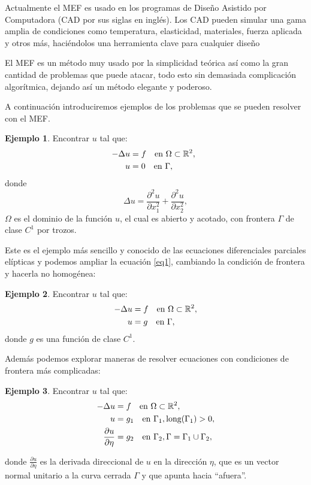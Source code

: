 \documentclass[12pt,spanish,oneside]{book}
\theoremstyle{plain}
\numberwithin{equation}{chapter}
\theoremstyle{definition}
\newtheorem{ej}{Ejemplo}[chapter]
\theoremstyle{remark}
\newcommand{\re}{\mathbb{R}}
\newcommand{\parc}[2]{\frac{\partial #1}{\partial #2}}
\begin{document}
Actualmente el MEF es usado en los programas de Diseño Asistido por Computadora (CAD por sus siglas en inglés). Los CAD pueden simular una gama amplia de condiciones como temperatura, elasticidad, materiales, fuerza aplicada y otros más, haciéndolos una herramienta clave para cualquier diseño

El MEF es un método muy usado por la simplicidad teórica así como la gran cantidad de problemas que puede atacar, todo esto sin demasiada complicación algorítmica, dejando así un método elegante y poderoso. 

A continuación introduciremos ejemplos de los problemas que se pueden resolver con el MEF. 

\begin{ej}
Encontrar $u$ tal que: 
\begin{equation}\label{eq1}
\begin{aligned}
-\Delta u &= f \hspace{10 pt} \text{en } \Omega \subset \re^2, \hspace{5pt} \\
u &=0 \hspace{10 pt} \text{en } \Gamma,
\end{aligned}
\end{equation}
donde \[\Delta u = \frac{\partial^2 u}{\partial x_1^2}+\frac{\partial^2 u}{\partial x_2^2},\] $\Omega $ es el dominio de la función $u$, el cual es abierto y acotado, con frontera $\Gamma$ de clase $C^1$ por trozos. 
\end{ej}
Este es el ejemplo más sencillo y conocido de las ecuaciones diferenciales parciales elípticas y podemos ampliar la ecuación \ref{eq1}, cambiando la condición de frontera y hacerla no homogénea:
\begin{ej}
Encontrar $u$ tal que: 
\begin{align*}
-\Delta u &= f \hspace{10 pt} \text{en } \Omega \subset \re^2, \\
u &=g\hspace{10 pt} \text{en } \Gamma, 
\end{align*}
donde $g$ es una función de clase $ C^1$.
\end{ej} 

Además podemos explorar maneras de resolver ecuaciones con condiciones de frontera más complicadas: 

\begin{ej}\label{otrcond}
Encontrar $u$ tal que: 
\begin{align*}
-\Delta u &= f \hspace{10 pt} \text{en } \Omega \subset \re^2 , \\
u &=g_1 \hspace{10 pt} \text{en } \Gamma_1 , \text{long}(\Gamma_1)>0,\\
\parc{u}{\eta} &=g_2 \hspace{10 pt} \text{en } \Gamma_2 , \Gamma= \Gamma_1\cup \Gamma_2,
\end{align*}

donde $\parc{u}{\eta}$ es la derivada direccional de $u$ en la dirección $\eta$, que es un vector normal unitario a la curva cerrada $\Gamma$ y que apunta hacia ``afuera''.
\end{ej}
\end{document}

